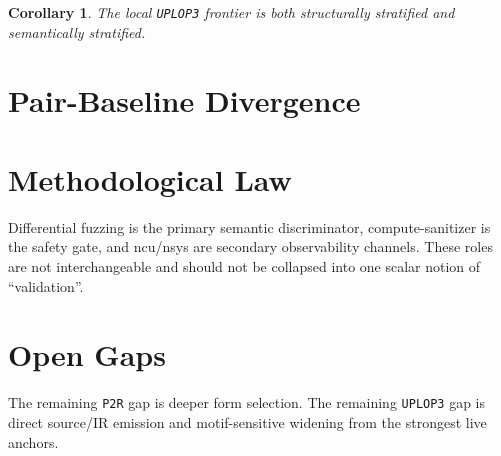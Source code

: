 \documentclass[11pt]{article}
\newtheorem{corollary}{Corollary}
\begin{document}
\begin{corollary}
The local \texttt{UPLOP3} frontier is both structurally stratified and
semantically stratified.
\end{corollary}



\section{Pair-Baseline Divergence}


\section{Methodological Law}
Differential fuzzing is the primary semantic discriminator, compute-sanitizer
is the safety gate, and ncu/nsys are secondary observability channels. These
roles are not interchangeable and should not be collapsed into one scalar
notion of ``validation''.

\section{Open Gaps}
The remaining \texttt{P2R} gap is deeper form selection. The remaining
\texttt{UPLOP3} gap is direct source/IR emission and motif-sensitive widening
from the strongest live anchors.





\end{document}
